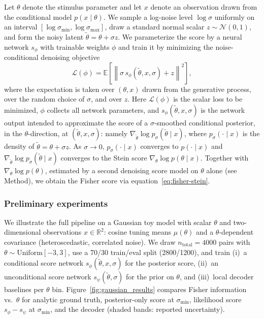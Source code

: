 Let $\theta$ denote the stimulus parameter and let $x$ denote an observation drawn from the conditional model $p(x\mid\theta)$. We sample a log-noise level $\log\sigma$ uniformly on an interval $[\log\sigma_{\min},\log\sigma_{\max}]$, draw a standard normal scalar $z\sim\mathcal{N}(0,1)$, and form the noisy latent $\tilde\theta=\theta+\sigma z$. We parameterize the score by a neural network $s_\phi$ with trainable weights $\phi$ and train it by minimizing the noise-conditional denoising objective
\begin{equation}
\label{eq:dsm-loss}
\mathcal{L}(\phi)=\mathbb{E}\left[\left\|\sigma\,s_\phi(\tilde\theta,x,\sigma)+z\right\|^2\right],
\end{equation}
where the expectation is taken over $(\theta,x)$ drawn from the generative process, over the random choice of $\sigma$, and over $z$. Here $\mathcal{L}(\phi)$ is the scalar loss to be minimized, $\phi$ collects all network parameters, and $s_\phi(\tilde\theta,x,\sigma)$ is the network output intended to approximate the score of a $\sigma$-smoothed conditional posterior, in the $\theta$-direction, at $(\tilde\theta,x,\sigma)$: namely $\nabla_{\tilde{\theta}} \log p_\sigma(\tilde{\theta}\mid x)$, where $p_\sigma(\cdot\mid x)$ is the density of $\tilde\theta=\theta+\sigma z$. As $\sigma \rightarrow 0$, $p_\sigma(\cdot\mid x)$ converges to $p(\cdot\mid x)$ and $\nabla_{\tilde{\theta}} \log p_\sigma(\tilde{\theta}\mid x)$ converges to the Stein score $\nabla_{\theta} \log p(\theta\mid x)$. Together with $\nabla_\theta \log p(\theta)$, estimated by a second denoising score model on $\theta$ alone (see Method), we obtain the Fisher score via equation~\ref{eq:fisher-stein}.

\subsubsection{Preliminary experiments}
We illustrate the full pipeline on a Gaussian toy model with scalar $\theta$ and two-dimensional observations $x\in\mathbb{R}^2$: cosine tuning means $\mu(\theta)$ and a $\theta$-dependent covariance (heteroscedastic, correlated noise). We draw $n_{\text{total}}=4000$ pairs with $\theta\sim\mathrm{Uniform}[-3,3]$, use a 70/30 train/eval split (2800/1200), and train (i)~a conditional score network $s_\phi(\tilde\theta,x,\sigma)$ for the posterior score, (ii)~an unconditional score network $s_\psi(\tilde\theta,\sigma)$ for the prior on $\theta$, and (iii)~local decoder baselines per $\theta$ bin. Figure~\ref{fig:gaussian_results} compares Fisher information vs.\ $\theta$ for analytic ground truth, posterior-only score at $\sigma_{\min}$, likelihood score $s_\phi-s_\psi$ at $\sigma_{\min}$, and the decoder (shaded bands: reported uncertainty).

